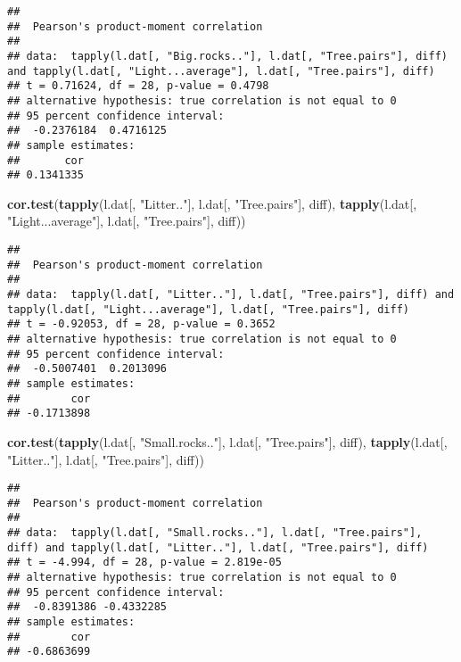 \documentclass[]{article}
\newenvironment{Shaded}{\begin{snugshade}}{\end{snugshade}}
\newcommand{\KeywordTok}[1]{\textcolor[rgb]{0.13,0.29,0.53}{\textbf{#1}}}
\newcommand{\StringTok}[1]{\textcolor[rgb]{0.31,0.60,0.02}{#1}}
\newcommand{\NormalTok}[1]{#1}
\begin{document}
\begin{verbatim}
## 
##  Pearson's product-moment correlation
## 
## data:  tapply(l.dat[, "Big.rocks.."], l.dat[, "Tree.pairs"], diff) and tapply(l.dat[, "Light...average"], l.dat[, "Tree.pairs"], diff)
## t = 0.71624, df = 28, p-value = 0.4798
## alternative hypothesis: true correlation is not equal to 0
## 95 percent confidence interval:
##  -0.2376184  0.4716125
## sample estimates:
##       cor 
## 0.1341335
\end{verbatim}

\begin{Shaded}
\begin{Highlighting}[]
\KeywordTok{cor.test}\NormalTok{(}\KeywordTok{tapply}\NormalTok{(l.dat[, }\StringTok{"Litter.."}\NormalTok{], l.dat[, }\StringTok{"Tree.pairs"}\NormalTok{], diff),}
         \KeywordTok{tapply}\NormalTok{(l.dat[, }\StringTok{"Light...average"}\NormalTok{], l.dat[, }\StringTok{"Tree.pairs"}\NormalTok{], diff))}
\end{Highlighting}
\end{Shaded}

\begin{verbatim}
## 
##  Pearson's product-moment correlation
## 
## data:  tapply(l.dat[, "Litter.."], l.dat[, "Tree.pairs"], diff) and tapply(l.dat[, "Light...average"], l.dat[, "Tree.pairs"], diff)
## t = -0.92053, df = 28, p-value = 0.3652
## alternative hypothesis: true correlation is not equal to 0
## 95 percent confidence interval:
##  -0.5007401  0.2013096
## sample estimates:
##        cor 
## -0.1713898
\end{verbatim}

\begin{Shaded}
\begin{Highlighting}[]
\KeywordTok{cor.test}\NormalTok{(}\KeywordTok{tapply}\NormalTok{(l.dat[, }\StringTok{"Small.rocks.."}\NormalTok{], l.dat[, }\StringTok{"Tree.pairs"}\NormalTok{], diff),}
         \KeywordTok{tapply}\NormalTok{(l.dat[, }\StringTok{"Litter.."}\NormalTok{], l.dat[, }\StringTok{"Tree.pairs"}\NormalTok{], diff))}
\end{Highlighting}
\end{Shaded}

\begin{verbatim}
## 
##  Pearson's product-moment correlation
## 
## data:  tapply(l.dat[, "Small.rocks.."], l.dat[, "Tree.pairs"], diff) and tapply(l.dat[, "Litter.."], l.dat[, "Tree.pairs"], diff)
## t = -4.994, df = 28, p-value = 2.819e-05
## alternative hypothesis: true correlation is not equal to 0
## 95 percent confidence interval:
##  -0.8391386 -0.4332285
## sample estimates:
##        cor 
## -0.6863699
\end{verbatim}
\end{document}
